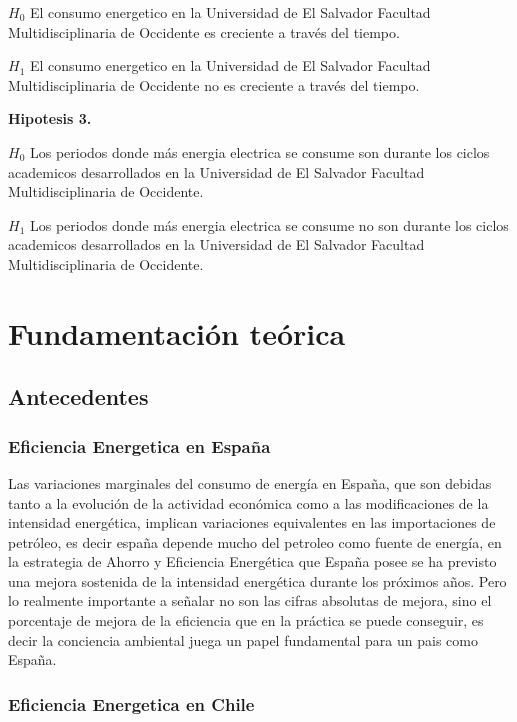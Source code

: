 \documentclass[12pt,letterpaper]{report}
\begin{document}
$H_0$ El consumo energetico en la Universidad de El Salvador Facultad Multidisciplinaria de Occidente es creciente a través del tiempo.

$H_1$ El consumo energetico en la Universidad de El Salvador Facultad Multidisciplinaria de Occidente no es creciente a través del tiempo.


\textbf{ Hipotesis 3.}

$H_0$ Los periodos donde más energia electrica se consume son durante los ciclos academicos desarrollados en la Universidad de El Salvador Facultad Multidisciplinaria de Occidente. 

$H_1$ Los periodos donde más energia electrica se consume no son durante los ciclos academicos desarrollados en la Universidad de El Salvador Facultad Multidisciplinaria de Occidente.





\chapter{Fundamentación teórica}
\section{Antecedentes}

  \subsection{Eficiencia Energetica en España}

Las variaciones marginales del consumo de energía en España, que son
debidas tanto a la evolución de la actividad económica como a las
modificaciones de la intensidad energética, implican variaciones equivalentes
en las importaciones de petróleo, es decir españa depende mucho del petroleo como fuente de energía, en la estrategia de Ahorro y Eficiencia Energética que España posee se ha previsto una mejora
sostenida de la intensidad energética durante los próximos años. Pero lo
realmente importante a señalar no son las cifras absolutas de mejora, sino el
porcentaje de mejora de la eficiencia que en la práctica se puede conseguir, es decir la conciencia ambiental juega un papel fundamental para un pais como España. 

 \subsection{Eficiencia Energetica en Chile}
 
\end{document}
